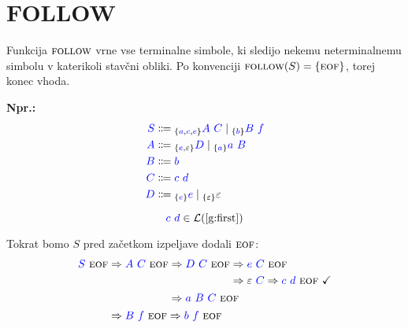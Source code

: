 \documentclass{article}
\newcommand{\Ex}{\textbf{Npr.:}\ }
\newcommand{\OK}{\ \checkmark}
\newcommand{\FOLLOW}{\textsc{follow}}
\newcommand{\EOF}{\textsc{eof}}
\newcommand{\Symbol}[1]{\textcolor{blue}{#1}}
\newcommand{\Null}{\varepsilon}
\newcommand{\Language}[1]{\mathcal{L}(#1)}
\newcommand{\MathRef}[1]{\text{\ref{#1}}}
\newcommand{\Arrow}{\Coloneq}
\newcommand{\Derive}{\Rightarrow}
\newcommand{\Seq}{\ }
\newcommand{\Union}{\mathrel{|}}
\newcommand{\Lookahead}[1]{{}_{\{{#1}\}}}
\begin{document}

\section{FOLLOW}
Funkcija $\FOLLOW$ vrne vse terminalne simbole, ki sledijo nekemu neterminalnemu simbolu v katerikoli stavčni obliki.
Po konvenciji $\FOLLOW(S) = \{\EOF\}$, torej konec vhoda.

\Ex
\begin{equation*}
  \begin{aligned}
    \Symbol{S} &\Arrow \Lookahead{\Symbol{a}, \Symbol{c}, \Symbol{e}} \Symbol{A} \Seq \Symbol{C} \Union \Lookahead{\Symbol{b}} \Symbol{B} \Seq \Symbol{f} \\
    \Symbol{A} &\Arrow \Lookahead{\Symbol{e}, \Null} \Symbol{D} \Union \Lookahead{\Symbol{a}} \Symbol{a} \Seq \Symbol{B} \\
    \Symbol{B} &\Arrow \Symbol{b}\\
    \Symbol{C} &\Arrow \Symbol{c} \Seq \Symbol{d}\\
    \Symbol{D} &\Arrow \Lookahead{\Symbol{e}} \Symbol{e} \Union \Lookahead{\Null} \Null
  \end{aligned}
\end{equation*}

\begin{equation*}
  \Symbol{c} \Seq \Symbol{d} \in \Language{\MathRef{g:first}}
\end{equation*}

Tokrat bomo $S$ pred začetkom izpeljave dodali $\EOF$:
\begin{equation*}
  \Symbol{S} \Seq \EOF \begin{aligned}[t]
    &\Derive \Symbol{A} \Seq \Symbol{C} \Seq \EOF \begin{aligned}[t]
      &\Derive \Symbol{D} \Seq \Symbol{C} \Seq \EOF \begin{aligned}[t]
        &\Derive \Symbol{e} \Seq \Symbol{C} \Seq \EOF\\
        &\Derive \Null \Seq \Symbol{C} \Derive \Symbol{c} \Seq \Symbol{d} \Seq \EOF \OK
      \end{aligned}\\
      &\Derive \Symbol{a} \Seq \Symbol{B} \Seq \Symbol{C} \Seq \EOF
    \end{aligned}\\
    &\Derive \Symbol{B} \Seq \Symbol{f} \Seq \EOF \Derive \Symbol{b} \Seq \Symbol{f} \Seq \EOF
  \end{aligned}
\end{equation*}
\end{document}
